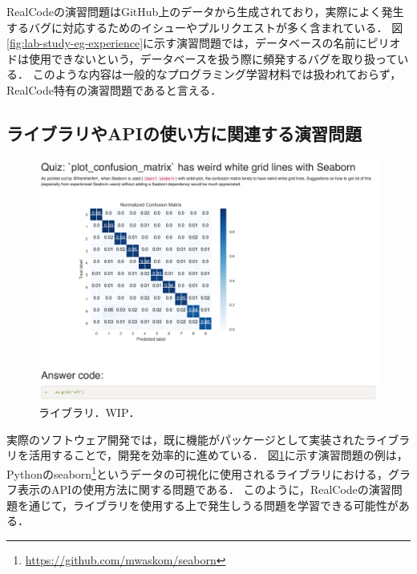 RealCodeの演習問題はGitHub上のデータから生成されており，実際によく発生するバグに対応するためのイシューやプルリクエストが多く含まれている．
図\ref{fig:lab-study-eg-experience}に示す演習問題では，データベースの名前にピリオドは使用できないという，データベースを扱う際に頻発するバグを取り扱っている．
このような内容は一般的なプログラミング学習材料では扱われておらず，RealCode特有の演習問題であると言える．


\subsection{ライブラリやAPIの使い方に関連する演習問題}

\begin{figure}[t]
	\centering
  \includegraphics[width=1.0\columnwidth]{20190107-lab-study-lib-exercise.png}
  \caption{ライブラリ．WIP．}
  \label{fig:lab-study-eg-lib}
\end{figure}

実際のソフトウェア開発では，既に機能がパッケージとして実装されたライブラリを活用することで，開発を効率的に進めている．
図\ref{fig:lab-study-eg-lib}に示す演習問題の例は，Pythonのseaborn\footnote{\url{https://github.com/mwaskom/seaborn}}というデータの可視化に使用されるライブラリにおける，グラフ表示のAPIの使用方法に関する問題である．
このように，RealCodeの演習問題を通じて，ライブラリを使用する上で発生しうる問題を学習できる可能性がある．
